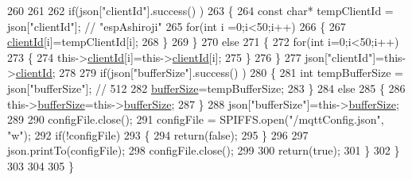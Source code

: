 \begin{DoxyCode}
260             
261                 
262                 \textcolor{keywordflow}{if}(json[\textcolor{stringliteral}{"clientId"}].success() )
263                 \{               
264                     \textcolor{keyword}{const} \textcolor{keywordtype}{char}* tempClientId = json[\textcolor{stringliteral}{"clientId"}]; \textcolor{comment}{// "espAshiroji"}
265                     \textcolor{keywordflow}{for}(\textcolor{keywordtype}{int} i =0;i<50;i++)
266                     \{
267                         \hyperlink{classCoolMQTT_af01bc6160c5a191e90df1b6e7318828d}{clientId}[i]=tempClientId[i];
268                     \}
269                 \}
270                 \textcolor{keywordflow}{else}
271                 \{
272                     \textcolor{keywordflow}{for}(\textcolor{keywordtype}{int} i=0;i<50;i++)
273                     \{
274                         this->\hyperlink{classCoolMQTT_af01bc6160c5a191e90df1b6e7318828d}{clientId}[i]=this->\hyperlink{classCoolMQTT_af01bc6160c5a191e90df1b6e7318828d}{clientId}[i];
275                     \}               
276                 \}
277                 json[\textcolor{stringliteral}{"clientId"}]=this->\hyperlink{classCoolMQTT_af01bc6160c5a191e90df1b6e7318828d}{clientId};
278                 
279                 \textcolor{keywordflow}{if}(json[\textcolor{stringliteral}{"bufferSize"}].success() )
280                 \{
281                     \textcolor{keywordtype}{int} tempBufferSize = json[\textcolor{stringliteral}{"bufferSize"}]; \textcolor{comment}{// 512}
282                     \hyperlink{classCoolMQTT_a7f3cf26b51d6770f216e42c5ef13ca9f}{bufferSize}=tempBufferSize;
283                 \}
284                 \textcolor{keywordflow}{else}
285                 \{
286                     this->\hyperlink{classCoolMQTT_a7f3cf26b51d6770f216e42c5ef13ca9f}{bufferSize}=this->\hyperlink{classCoolMQTT_a7f3cf26b51d6770f216e42c5ef13ca9f}{bufferSize};
287                 \}
288                 json[\textcolor{stringliteral}{"bufferSize"}]=this->\hyperlink{classCoolMQTT_a7f3cf26b51d6770f216e42c5ef13ca9f}{bufferSize};
289 
290                 configFile.close();
291                 configFile = SPIFFS.open(\textcolor{stringliteral}{"/mqttConfig.json"}, \textcolor{stringliteral}{"w"});
292                 \textcolor{keywordflow}{if}(!configFile)
293                 \{
294                     \textcolor{keywordflow}{return}(\textcolor{keyword}{false});              
295                 \}
296                 
297                 json.printTo(configFile);
298                 configFile.close();
299               
300               \textcolor{keywordflow}{return}(\textcolor{keyword}{true}); 
301         \}
302     \}   
303     
304 
305 \}
\end{DoxyCode}
\mbox{\label{classCoolMQTT_a58b0b1f64b269c2681685208262fba1d}} 
